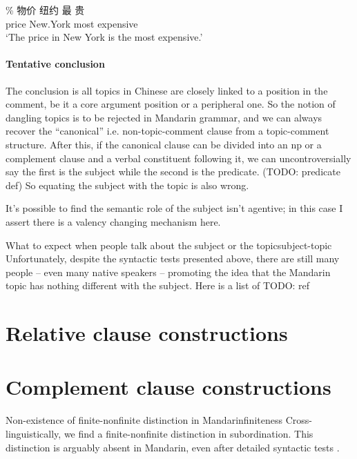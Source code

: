 \documentclass[UTF8, a4paper, oneside, scheme=plain, 12pt]{ctexrep}
\newcommand{\translate}[1]{`#1'}
\begin{document}
\begin{exe}
    \ex \gll \% 物价 纽约 最 贵  \\
    {} price New.York most expensive \\
    \glt \translate{The price in New York is the most expensive.}
\end{exe}

\subsubsection{Tentative conclusion}

The conclusion is all topics in Chinese are closely linked to a position in the comment,
be it a core argument position or a peripheral one.
So the notion of dangling topics is to be rejected in Mandarin grammar,
and we can always recover the ``canonical'' i.e. non-topic-comment clause
from a topic-comment structure.
After this, if the canonical clause can be divided into an \acs{np}
or a complement clause and a verbal constituent following it,
we can uncontroversially say the first is the subject while the second is the predicate. (TODO: predicate def)
So equating the subject with the topic is also wrong.

It's possible to find the semantic role of the subject isn't agentive;
in this case I assert there is a valency changing mechanism here.

\begin{infobox}{What to expect when people talk about the subject or the topic}{subject-topic}
    Unfortunately, despite the syntactic tests presented above,
    there are still many people -- even many native speakers -- 
    promoting the idea that the Mandarin topic has nothing different with the subject.
    Here is a list of TODO: ref
\end{infobox}

\chapter{Relative clause constructions}





\chapter{Complement clause constructions}\label{sec:complement-clause}


\begin{infobox}{Non-existence of finite-nonfinite distinction in Mandarin}{finiteness}
    Cross-linguistically, we find a finite-nonfinite distinction in subordination.
    This distinction is arguably absent in Mandarin,
    even after detailed syntactic tests \citep{no-finite}.
\end{infobox}
\end{document}
